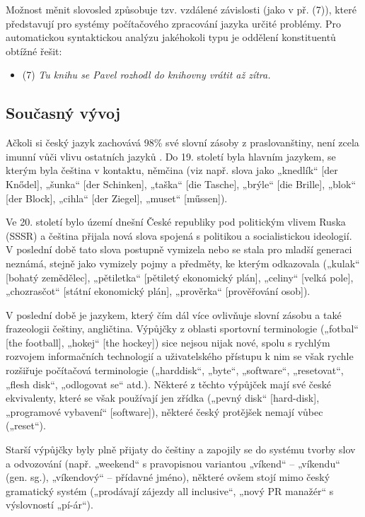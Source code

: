 \begin{multicols}{2}
Možnost měnit slovosled způsobuje tzv. vzdálené závislosti (jako v př. (7)), které představují pro systémy počítačového zpracování jazyka určité problémy. Pro automatickou syntaktickou analýzu jakéhokoli typu je oddělení konstituentů obtížné řešit:
\begin{itemize}
\item[] (7)	\textit{Tu knihu se Pavel rozhodl do knihovny vrátit až zítra.}
\end{itemize}

\subsection{Současný vývoj}

Ačkoli si český jazyk zachovává 98\% své slovní zásoby z praslovanštiny, není zcela imunní vůči vlivu ostatních jazyků \cite{Note5}. Do 19. století byla hlavním jazykem, se kterým byla čeština v kontaktu, němčina (viz např. slova jako „knedlík“ {[}der Knődel{]}, „šunka“ {[}der Schinken{]}, „taška“ {[}die Tasche{]}, „brýle“ {[}die Brille{]}, „blok“ {[}der Block{]}, „cihla“ {[}der Ziegel{]}, „muset“ {[}műssen{]}).

Ve 20. století bylo území dnešní České republiky pod politickým vlivem Ruska (SSSR) a čeština přijala nová slova spojená s politikou a socialistickou ideologií. V poslední době tato slova postupně vymizela nebo se stala pro mladší generaci neznámá, stejně jako vymizely pojmy a předměty, ke kterým odkazovala („kulak“ {[}bohatý zemědělec{]}, „pětiletka“ {[}pětiletý ekonomický plán{]}, „celiny“ {[}velká pole{]}, „chozrasčot“ {[}státní ekonomický plán{]}, „prověrka“ {[}prověřování osob{]}).

V poslední době je jazykem, který čím dál více ovlivňuje slovní zásobu a také frazeologii češtiny, angličtina. Výpůjčky z oblasti sportovní terminologie („fotbal“ {[}the football{]}, „hokej“ {[}the hockey{]}) sice nejsou nijak nové, spolu s rychlým rozvojem informačních technologií a uživatelského přístupu k nim se však rychle rozšiřuje počítačová terminologie („harddisk“, „byte“, „software“, „resetovat“, „flesh disk“, „odlogovat se“ atd.). Některé z těchto výpůjček mají své české ekvivalenty, které se však používají jen zřídka („pevný disk“ {[}hard-disk{]}, „programové vybavení“ {[}software{]}), některé český protějšek nemají vůbec („reset“).

Starší výpůjčky byly plně přijaty do češtiny a zapojily se do systému tvorby slov a odvozování (např. „weekend“ s pravopisnou variantou „víkend“ – „víkendu“ (gen. sg.), „víkendový“ – přídavné jméno), některé ovšem stojí mimo český gramatický systém („prodávají zájezdy all inclusive“, „nový PR manažér“ s výslovností „pí-ár“).


\end{multicols}
